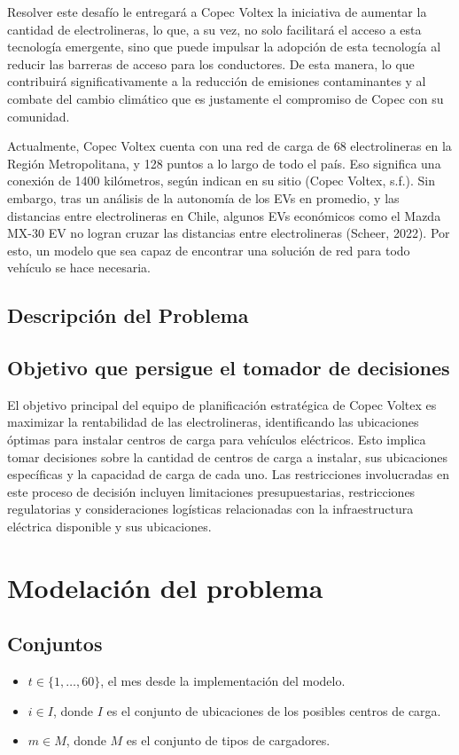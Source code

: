 \documentclass[letterpaper]{article}
\begin{document}
\begin{flushleft}
		Resolver este desafío le entregará a Copec Voltex la iniciativa de aumentar la cantidad de electrolineras, lo que, a su vez, no solo facilitará el acceso a esta tecnología emergente, sino que puede impulsar la adopción de esta tecnología al reducir las barreras de acceso para los conductores. De esta manera, lo que contribuirá significativamente a la reducción de emisiones contaminantes y al combate del cambio climático que es justamente el compromiso de Copec con su comunidad. 

		Actualmente, Copec Voltex cuenta con una red de carga de 68 electrolineras en la Región Metropolitana, y 128 puntos a lo largo de todo el país. Eso significa una conexión de 1400 kilómetros, según indican en su sitio (Copec Voltex, s.f.). Sin embargo, tras un análisis de la autonomía de los EVs en promedio, y las distancias entre electrolineras en Chile, algunos EVs económicos como el Mazda MX-30 EV no logran cruzar las distancias entre electrolineras (Scheer, 2022). Por esto, un modelo que sea capaz de encontrar una solución de red para todo vehículo se hace necesaria. 
 
		\subsection{Descripción del Problema}
		\subsection{Objetivo que persigue el tomador de decisiones}
		El objetivo principal del equipo de planificación estratégica de Copec Voltex es maximizar la rentabilidad de las electrolineras, identificando las ubicaciones óptimas para instalar centros de carga para vehículos eléctricos. Esto implica tomar decisiones sobre la cantidad de centros de carga a instalar, sus ubicaciones específicas y la capacidad de carga de cada uno. Las restricciones involucradas en este proceso de decisión incluyen limitaciones presupuestarias, restricciones regulatorias y consideraciones logísticas relacionadas con la infraestructura eléctrica disponible y sus ubicaciones. 		
		\section{Modelación del problema}
		\subsection{Conjuntos}
		\begin{itemize}
			\item $t \in \{1, \ldots, 60\}$, el mes desde la implementación del modelo.
			\item $i \in I$, donde $I$ es el conjunto de ubicaciones de los posibles centros de carga.
			\item $m \in M$, donde $M$ es el conjunto de tipos de cargadores.
		\end{itemize}
		

\end{flushleft}
\end{document}
